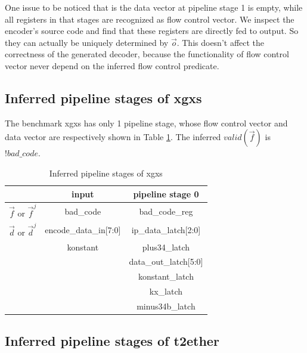 \documentclass[conference]{IEEEtran}
\begin{document}
One issue to be noticed that is the data vector at pipeline stage 1 is empty,
while all registers in that stages are recognized as flow control vector.
We inspect the encoder's source code and find that these registers are 
directly fed to output.
So they can actually be uniquely determined by $\vec{o}$.
This doesn't affect the correctness of the generated decoder,
because the functionality of flow control vector never depend on the inferred flow control predicate.


\subsection{Inferred pipeline stages of xgxs}


The benchmark xgxs has only 1 pipeline stage,
whose flow control vector and data vector are respectively shown in Table \ref{tab_xgxs}.
The inferred $valid(\vec{f})$ is $!bad\_code$.

\begin{table}[b]
\centering
\caption{Inferred pipeline stages of xgxs}
\begin{tabular}{|c|c|c|}
\hline
                       & input                  &  pipeline stage 0    \\\hline\hline
$\vec{f}$ or $\vec{f}^j$&bad\_code              & bad\_code\_reg\\\hline
$\vec{d}$ or $\vec{d}^j$&encode\_data\_in[7:0]  &ip\_data\_latch[2:0] \\
                       &konstant                &plus34\_latch     \\
                       &                        &data\_out\_latch[5:0]\\
                       &                        &konstant\_latch   \\
                       &                        &kx\_latch         \\
                       &                        &minus34b\_latch   \\\hline
\end{tabular}\label{tab_xgxs} 
\end{table}


\subsection{Inferred pipeline stages of t2ether}
\end{document}

